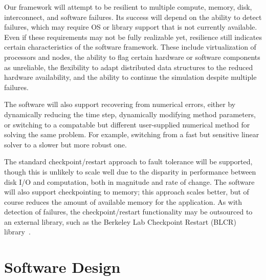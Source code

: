 \documentclass[10pt,twocolumn]{article}
\begin{document}
Our framework will attempt to be resilient to multiple compute,
memory, disk, interconnect, and software failures.  Its success will
depend on the ability to detect failures, which may require OS or
library support that is not currently available.  Even if these
requirements may not be fully realizable yet, resilience still
indicates certain characteristics of the software framework.  These
include virtualization of processors and nodes, the ability to flag
certain hardware or software components as unreliable, the flexibility
to adapt distributed data structures to the reduced hardware
availability, and the ability to continue the simulation despite
multiple failures.

The software will also support recovering from numerical errors,
either by dynamically reducing the time step, dynamically modifying
method parameters, or switching to a compatable but different
user-supplied numerical method for solving the same problem.  For
example, switching from a fast but sensitive linear solver to a slower
but more robust one.

The standard checkpoint/restart approach to fault tolerance will be
supported, though this is unlikely to scale well due to the disparity
in performance between disk I/O and computation, both in magnitude and
rate of change.  The software will also support checkpointing to
memory; this approach scales better, but of course reduces the amount
of available memory for the application.  As with detection of
failures, the checkpoint/restart functionality may be outsourced to
an external library, such as the Berkeley Lab Checkpoint Restart
(BLCR) library~\cite{wwwblcr}.


\section{Software Design} \label{s:design}

\end{document}

